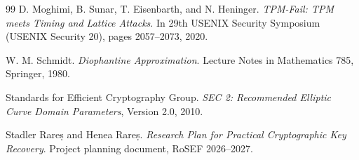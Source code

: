 \documentclass[11pt,a4paper]{article}
\begin{document}
\begin{thebibliography}{99}
D. Moghimi, B. Sunar, T. Eisenbarth, and N. Heninger.
\emph{TPM-Fail: TPM meets Timing and Lattice Attacks}.
In 29th USENIX Security Symposium (USENIX Security 20), pages 2057--2073, 2020.

W. M. Schmidt.
\emph{Diophantine Approximation}.
Lecture Notes in Mathematics 785, Springer, 1980.

Standards for Efficient Cryptography Group.
\emph{SEC 2: Recommended Elliptic Curve Domain Parameters}, Version 2.0, 2010.

Stadler Rareș and Henea Rareș.
\emph{Research Plan for Practical Cryptographic Key Recovery}.
Project planning document, RoSEF 2026--2027.

\end{thebibliography}
\end{document}
